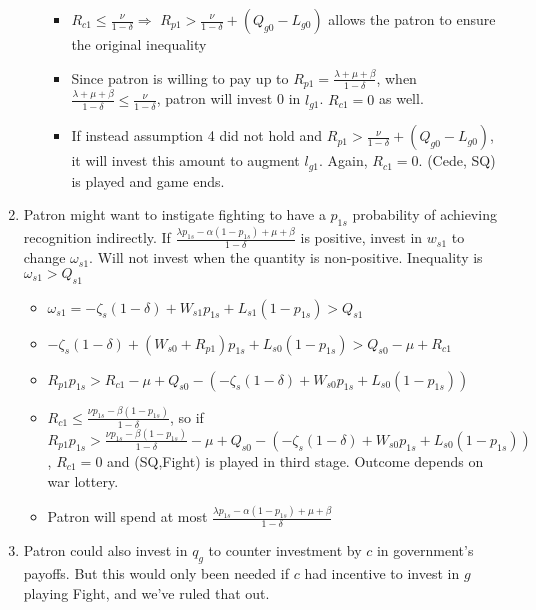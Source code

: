 \documentclass[12pt]{article}
\newcommand{\de}{\delta}
\begin{document}
\begin{enumerate}
\begin{itemize}
\begin{itemize}
					\item $R_{c1} \leq \frac{\nu}{1-\de} \Rightarrow$ $R_{p1} > \frac{\nu}{1-\de} + \left( Q_{g0} - L_{g0}\right)$ allows the patron to ensure the original inequality
					\item Since patron is willing to pay up to $R_{p1} = \frac{\lambda +\mu + \beta}{1-\de}$, when $\frac{\lambda +\mu + \beta}{1-\de} \leq \frac{\nu}{1-\de}$, patron will invest 0 in $l_{g1}$. $R_{c1} = 0$ as well.
					\item If instead assumption 4 did not hold and $R_{p1} > \frac{\nu}{1-\de} + \left( Q_{g0} - L_{g0}\right)$, it will invest this amount to augment $l_{g1}$. Again, $R_{c1} = 0$. (Cede, SQ) is played and game ends.
				\end{itemize}
		\end{itemize}
	\item Patron might want to instigate fighting to have a $p_{1s}$ probability of achieving recognition indirectly. If $\frac{\lambda p_{1s} - \alpha (1-p_{1s}) + \mu + \beta}{1 - \de}$ is positive, invest in $w_{s1}$ to change $\omega_{s1}$. Will not invest when the quantity is non-positive. Inequality is $\omega_{s1} > Q_{s1}$
		\begin{itemize}
			\item $\omega_{s1} = -\zeta_{s}(1-\de) + W_{s1}p_{1s} + L_{s1}(1-p_{1s}) > Q_{s1}$
			\item $-\zeta_{s}(1-\de) + (W_{s0}+R_{p1})p_{1s} + L_{s0}(1-p_{1s}) > Q_{s0} - \mu + R_{c1}$
			\item $R_{p1}p_{1s} > R_{c1} - \mu + Q_{s0} - \left(-\zeta_{s}(1-\de) + W_{s0}p_{1s} + L_{s0}(1-p_{1s})\right)$
			\item $R_{c1} \leq \frac{\nu p_{1s} - \beta (1-p_{1s})}{1 -\de}$, so if $R_{p1}p_{1s} > \frac{\nu p_{1s} - \beta (1-p_{1s})}{1 -\de} - \mu + Q_{s0} - \left(-\zeta_{s}(1-\de) + W_{s0}p_{1s} + L_{s0}(1-p_{1s})\right)$, $R_{c1}=0$ and (SQ,Fight) is played in third stage. Outcome depends on war lottery.
			\item Patron will spend at most $\frac{\lambda p_{1s} - \alpha (1-p_{1s}) +\mu + \beta}{1 -\de}$
		\end{itemize}
	\item Patron could also invest in $q_g$ to counter investment by $c$ in government's payoffs. But this would only been needed if $c$ had incentive to invest in $g$ playing Fight, and we've ruled that out.
\end{enumerate}
\end{document}
